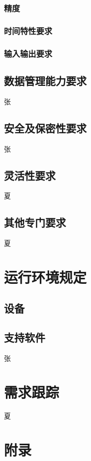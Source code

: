 \documentclass[UTF8]{ctexart}
\begin{document}
\subsubsection{精度}

\subsubsection{时间特性要求}

\subsubsection{输入输出要求}

\subsection{数据管理能力要求}
张
\subsection{安全及保密性要求}
张
\subsection{灵活性要求}
夏
\subsection{其他专门要求}
夏
\section{运行环境规定}
\subsection{设备}

\subsection{支持软件}
张
\section{需求跟踪}
夏
\section{附录}
\end{document}
